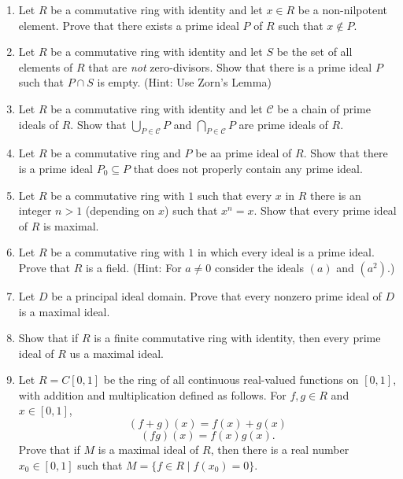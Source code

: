 \documentclass{article}
\theoremstyle{definition}
\begin{document}
\begin{enumerate}
            \item Let $R$ be a commutative ring with identity and let $x\in R$ be a non-nilpotent element. Prove that there exists a prime ideal $P$ of $R$ such that $x\notin P$.
            
            \item Let $R$ be a commutative ring with identity and let $S$ be the set of all elements of $R$ that are \textit{not} zero-divisors. Show that there is a prime ideal $P$ such that $P\cap S$ is empty. (Hint: Use Zorn's Lemma)
            
            \item Let $R$ be a commutative ring with identity and let $\mathcal{C}$ be a chain of prime ideals of $R$. Show that $\bigcup _{P\in \mathcal{C}} P$ and $\bigcap _{P\in \mathcal{C}} P$ are prime ideals of $R$.
            
            \item Let $R$ be a commutative ring and $P$ be aa prime ideal of $R$. Show that there is a prime ideal $P_0\subseteq P$ that does not properly contain any prime ideal.
            
            \item Let $R$ be a commutative ring with $1$ such that every $x$ in $R$ there is an integer $n>1$ (depending on $x$) such that $x^n=x$. Show that every prime ideal of $R$ is maximal.
            
            \item Let $R$ be a commutative ring with $1$ in which every ideal is a prime ideal. Prove that $R$ is a field. (Hint: For $a\neq 0$ consider the ideals $(a)$ and $(a^2)$.)
            
            \item Let $D$ be a principal ideal domain. Prove that every nonzero prime ideal of $D$ is a maximal ideal. 
            
            \item Show that if $R$ is a finite commutative ring with identity, then every prime ideal of $R$ us a maximal ideal.
            
            \item Let $R=C[0,1]$ be the ring of all continuous real-valued functions on $[0,1]$, with addition and multiplication defined as follows. For $f,g\in R$ and $x\in [0,1]$, \[(f+g)(x)=f(x)+g(x)\] \[(fg)(x)=f(x)g(x).\] Prove that if $M$ is a maximal ideal of $R$, then there is a real number $x_0\in [0,1]$ such that $M=\{f\in R \mid  f(x_0)=0\}$.
            

\end{enumerate}
\end{document}

